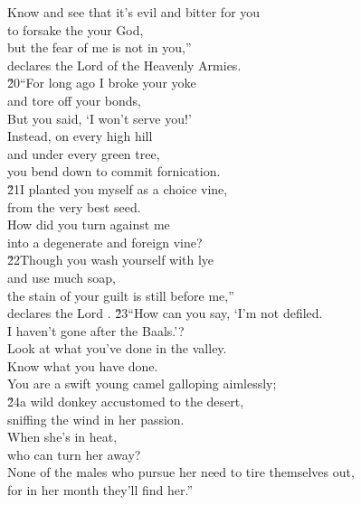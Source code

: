 \begin{poetry}
\poeml Know and see that it's evil and bitter for you \\
\poemll    to forsake the  your God, \\
\poeml but the fear of me is not in you,'' \\
\poemll    declares the Lord  of the Heavenly Armies. \\
\poeml \v{20}``For long ago I broke your yoke \\
\poemll    and tore off your bonds, \\
\poeml But you said, `I won't serve you!' \\
\poemll    Instead, on every high hill \\
\poeml and under every green tree, \\
\poemll    you bend down to commit fornication. \\
\poeml \v{21}I planted you myself as a choice vine, \\
\poemll    from the very best seed. \\
\poeml How did you turn against me \\
\poemll    into a degenerate and foreign vine? \\
\poeml \v{22}Though you wash yourself with lye \\
\poemll    and use much soap, \\
\poeml the stain of your guilt is still before me,'' \\
\poemlll       declares the Lord .
\poeml \v{23}``How can you say, `I'm not defiled. \\
\poemll    I haven't gone after the Baals.'? \\
\poeml Look at what you've done in the valley. \\
\poemll    Know what you have done. \\
\poemlll       You are a swift young camel galloping aimlessly; \\
\poeml \v{24}a wild donkey accustomed to the desert, \\
\poemll    sniffing the wind in her passion. \\
\poeml When she's in heat, \\
\poemll    who can turn her away? \\
\poeml None of the males who pursue her need to tire themselves out, \\
\poemll    for in her month they'll find her.'' \\

\end{poetry}
